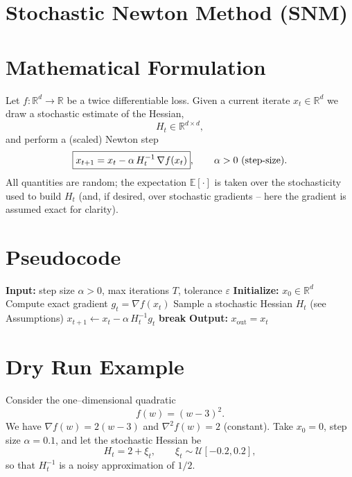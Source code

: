 \documentclass{article}
\newcommand{\E}{\mathbb{E}}
\newcommand{\R}{\mathbb{R}}
\newcommand{\norm}[1]{\left\|#1\right\|}
\begin{document}
\section*{Stochastic Newton Method (SNM)}

\section*{Mathematical Formulation}
Let $f:\R^{d}\rightarrow\R$ be a twice differentiable loss.  
Given a current iterate $x_t\in\R^{d}$ we draw a stochastic estimate of the
Hessian,
\[
H_t\in\R^{d\times d},
\]
and perform a (scaled) Newton step
\begin{equation}
\boxed{%
x_{t+1}=x_t-\alpha\,H_t^{-1}\,\nabla f(x_t)},\qquad
\alpha>0 \text{ (step‑size)} .
\label{eq:update}
\end{equation}
All quantities are random; the expectation $\E[\cdot]$ is taken over the
stochasticity used to build $H_t$ (and, if desired, over stochastic
gradients – here the gradient is assumed exact for clarity).

\section*{Pseudocode}
\begin{algorithm}[H]
\caption{Stochastic Newton Method}
\begin{algorithmic}[1]
\STATE \textbf{Input:} step size $\alpha>0$, max iterations $T$, tolerance $\varepsilon$
\STATE \textbf{Initialize:} $x_0\in\R^{d}$
\STATE Compute exact gradient $g_t=\nabla f(x_t)$
\STATE Sample a stochastic Hessian $H_t$ (see Assumptions)
\STATE $x_{t+1}\gets x_t-\alpha\,H_t^{-1}g_t$
\IF{$\norm{x_{t+1}-x_t}\le \varepsilon$}
\STATE \textbf{break}
\ENDIF
\ENDFOR
\STATE \textbf{Output:} $x_{\text{out}}=x_{t}$
\end{algorithmic}
\end{algorithm}

\section*{Dry Run Example}
Consider the one–dimensional quadratic
\[
f(w)=(w-3)^2 .
\]
We have $\nabla f(w)=2(w-3)$ and $\nabla^2 f(w)=2$ (constant).  
Take $x_0=0$, step size $\alpha=0.1$, and let the stochastic Hessian be
\[
H_t = 2+\xi_t,\qquad \xi_t\sim\mathcal{U}[-0.2,0.2],
\]
so that $H_t^{-1}$ is a noisy approximation of $1/2$.
\end{document}
